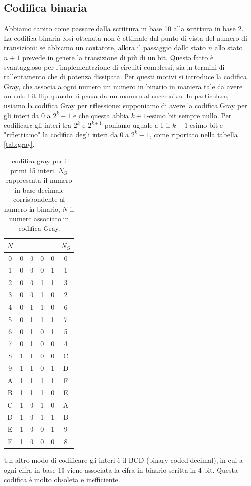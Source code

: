 \documentclass[a4paper, 11pt]{article}
\newcommand{\E}{\mathcal{E}}
\newcommand{\B}{\mathcal{B}}
\begin{document}
\subsection{Codifica binaria}
Abbiamo capito come passare dalla scrittura in base 10 alla scrittura in base 2. La codifica binaria così ottenuta non è ottimale dal punto di vista del numero di transizioni: se abbiamo un contatore, allora il passaggio dallo stato $n$ allo stato $n+1$ prevede in genere la transizione di più di un bit. Questo fatto è svantaggioso per l'implementazione di circuiti complessi, sia in termini di rallentamento che di potenza dissipata. Per questi motivi si introduce la codifica Gray, che associa a ogni numero un numero in binario in maniera tale da avere un solo bit flip quando si passa da un numero al successivo. In particolare, usiamo la codifica Gray per riflessione: supponiamo di avere la codifica Gray per gli interi da 0 a $2^{k}-1$ e che questa abbia $k+1$-esimo bit sempre nullo. Per codificare gli interi tra $2^k$ e $2^{k+1}$ poniamo uguale a 1 il $k+1$-esimo bit e "riflettiamo" la codifica degli interi da 0 a $2^k-1$, come riportato nella tabella \ref{tab:gray}.
\begin{table}[h!]
	\centering
	\begin{tabular}{c | c c c c|c}
		$N$&&&&&$N_G$\\\hline
		0&0&0&0&0&0\\1&0&0&0&1&1\\\hline2&0&0&1&1&3\\3&0&0&1&0&2\\\hline4&0&1&1&0&6\\5&0&1&1&1&7\\6&0&1&0&1&5\\7&0&1&0&0&4\\\hline8&1&1&0&0&C\\9&1&1&0&1&D\\A&1&1&1&1&F\\B&1&1&1&0&E\\C&1&0&1&0&A\\D&1&0&1&1&B\\E&1&0&0&1&9\\F&1&0&0&0&8
	\end{tabular}
	\caption{codifica gray per i primi 15 interi. $N_G$ rappresenta il numero in base decimale corrispondente al numero in binario, $N$ il numero associato in codifica Gray.}
\end{table}

Un altro modo di codificare gli interi è il BCD (binary coded decimal), in cui a ogni cifra in base 10 viene associata la cifra in binario scritta in 4 bit. Questa codifica è molto obsoleta e inefficiente.
\end{document}
